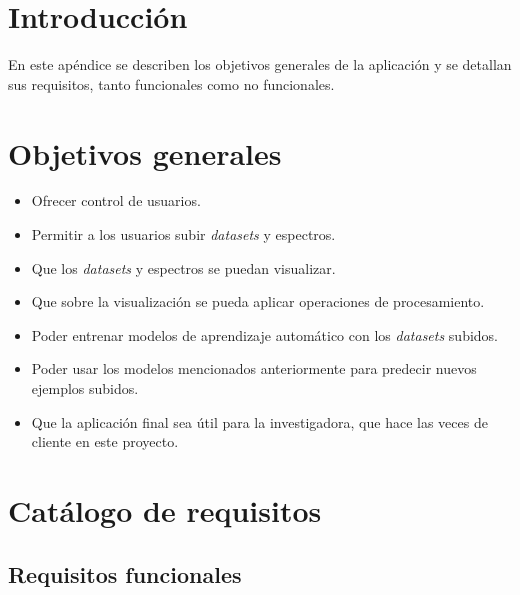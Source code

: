 
\section{Introducción}

En este apéndice se describen los objetivos generales de la aplicación y se 
detallan sus requisitos, tanto funcionales como no funcionales.

\section{Objetivos generales}

\begin{itemize}
	\item Ofrecer control de usuarios.
	\item Permitir a los usuarios subir \textit{datasets} y espectros.
	\item Que los \textit{datasets} y espectros se puedan visualizar.
	\item Que sobre la visualización se pueda aplicar operaciones de 
	procesamiento.
	\item Poder entrenar modelos de aprendizaje automático con los
	\textit{datasets} subidos.
	\item Poder usar los modelos mencionados anteriormente para predecir nuevos
	ejemplos subidos.
	\item Que la aplicación final sea útil para la investigadora, que hace las 
	veces de cliente en este proyecto.
\end{itemize}

\section{Catálogo de requisitos}

\subsection{Requisitos funcionales}

